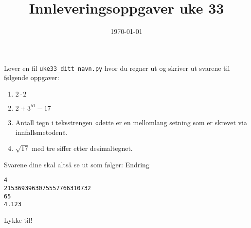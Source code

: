 \documentclass[11pt]{article}
\date{\today}
\title{Innleveringsoppgaver uke 33}
\begin{document}
\maketitle
Lever en fil \texttt{uke33\_ditt\_navn.py} hvor du regner ut og skriver ut svarene til følgende oppgaver:

\begin{enumerate}
\item \(2\cdot2\)
\item \(2 + 3^{51} - 17\)
\item Antall tegn i teksstrengen «dette er en mellomlang setning som er skrevet via innfallsmetoden».
\item \(\sqrt{17}\) med tre siffer etter desimaltegnet.
\end{enumerate}

Svarene dine skal altså se ut som følger: Endring
\begin{verbatim}
4
2153693963075557766310732
65
4.123
\end{verbatim}

Lykke til!
\end{document}
